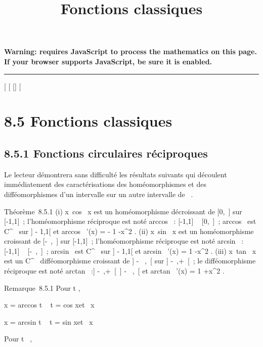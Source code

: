 \documentclass[]{article}
\title{Fonctions classiques}
\author{}
\date{}
\begin{document}
\maketitle

\textbf{Warning: 
requires JavaScript to process the mathematics on this page.\\ If your
browser supports JavaScript, be sure it is enabled.}

\begin{center}\rule{3in}{0.4pt}\end{center}

[
[
[]
[

\section{8.5 Fonctions classiques}

\subsection{8.5.1 Fonctions circulaires réciproques}

Le lecteur démontrera sans difficulté les résultats suivants qui
découlent immédiatement des caractérisations des homéomorphismes et des
difféomorphismes d'un intervalle sur un autre intervalle de ~.

Théorème~8.5.1 (i)
x\mapsto~cos~ x est un
homéomorphisme décroissant de [0,\pi~] sur [-1,1]~;
l'homéomorphisme réciproque est noté arccos~ :
[-1,1] \rightarrow~ [0,\pi~]~; arccos~ est
C^\infty~ sur ] - 1,1[ et arccos~ '(x)
= - 1 \over {}-x^2
. (ii) x\mapsto~sin~ x est
un homéomorphisme croissant de [-\pi~,\pi~] sur [-1,1]~;
l'homéomorphisme réciproque est noté arcsin~ :
[-1,1] \rightarrow~ [-\pi~,\pi~]~; arcsin~ est
C^\infty~ sur ] - 1,1[ et arcsin~ '(x)
= 1 \over {}-x^2 .
(iii) x\mapsto~tan~ x est
un C^\infty~ difféomorphisme croissant de ] - \pi~,\pi~[ sur ]
-\infty~,+\infty~[~; le difféomorphisme réciproque est noté
arctan~ :] -\infty~,+\infty~[\rightarrow~] - \pi~,\pi~[ et
arctan~ '(x) = 1 +x^2 .

Remarque~8.5.1 Pour t \in [-1,1],

x = arccos t \mathrel\Leftrightarrow~ t
= cos x\text et ~x \in
[0,\pi~]

x = arcsin t \mathrel\Leftrightarrow~ t
= sin x\text et ~x 

Pour t \in {}~,
\end{document}
